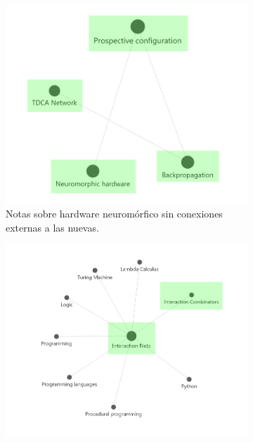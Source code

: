 \begin{figure}[h!]
    \centering
    \begin{subfigure}[b]{0.48\textwidth}
        \centering
        \includegraphics[width=\textwidth]{figures/neuromPart.png}
        \caption{Notas sobre hardware neuromórfico sin conexiones externas a las nuevas.}
        \label{fig:wiki_isolated}
    \end{subfigure}
    \hfill
    \begin{subfigure}[b]{0.5\textwidth}
        \centering
        \includegraphics[width=\textwidth]{figures/IntNetsPart.png}

\end{subfigure}
\end{figure}
